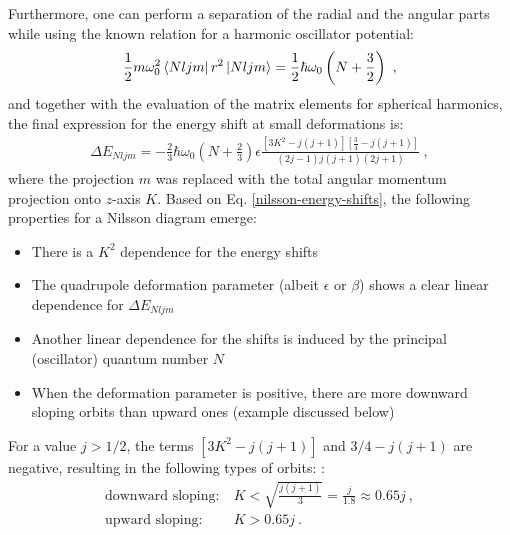 Furthermore, one can perform a separation of the radial and the angular parts while using the known relation for a harmonic oscillator potential:
\begin{align}
    \frac{1}{2}m\omega_0^2\bra{Nljm}r^2\ket{Nljm}=\frac{1}{2}\hbar\omega_0\left(N+\frac{3}{2}\right)\ ,
\end{align}
and together with the evaluation of the matrix elements for spherical harmonics, the final expression for the energy shift at small deformations is:
\begin{align}
    \Delta E_{Nljm}=-\frac{2}{3}\hbar\omega_0\left(N+\frac{2}{3}\right)\epsilon\frac{\left[3K^2-j(j+1)\right]\left[\frac{3}{4}-j(j+1)\right]}{(2j-1)j(j+1)(2j+1)}\ ,
    \label{nilsson-energy-shifts}
\end{align}
where the projection $m$ was replaced with the total angular momentum projection onto $z$-axis $K$. Based on Eq. \ref{nilsson-energy-shifts}, the following properties for a Nilsson diagram emerge:
\begin{itemize}
    \item There is a $K^2$ dependence for the energy shifts
    \item The quadrupole deformation parameter (albeit $\epsilon$ or $\beta$) shows a clear linear dependence for $\Delta E_{Nljm}$
    \item Another linear dependence for the shifts is induced by the principal (oscillator) quantum number $N$
    \item When the deformation parameter is positive, there are more downward sloping orbits than upward ones (example discussed below)
\end{itemize}

For a value $j>1/2$, the terms $\left[3K^2-j(j+1)\right]$ and $3/4-j(j+1)$ are negative, resulting in the following types of orbits: \cite{krane1991introductory}:
\begin{align}
    \text{downward sloping:}&\ K<\sqrt{\frac{j(j+1)}{3}}=\frac{j}{1.8}\approx 0.65j\ ,\\
    \text{upward sloping:}&\ K>0.65j\ .
\end{align}

